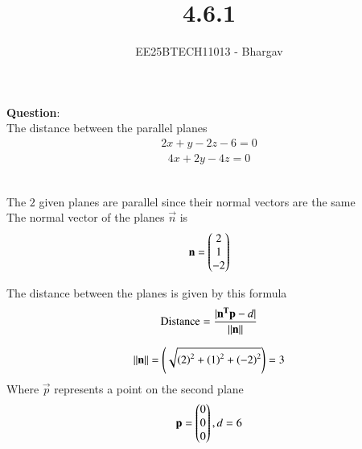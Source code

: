 \documentclass[journal]{IEEEtran}
\begin{document}

\vspace{3cm}

\title{4.6.1}
\author{EE25BTECH11013 - Bhargav}
\maketitle
{\let\newpage\relax\maketitle}

\renewcommand{\thefigure}{\theenumi}
\renewcommand{\thetable}{\theenumi}
\setlength{\intextsep}{10pt} %


\renewcommand{\thetable}{\theenumi}

\textbf{Question}:\\
The distance between the parallel planes 
\begin{align}
2x + y - 2z - 6 = 0
\end{align}
\begin{align}
4x + 2y - 4z = 0
\end{align}

\solution \\

The $2$ given planes are parallel since their normal vectors are the same\\

The normal vector of the planes $\vec{n}$ is
\begin{align}
\mathbf{n} = \begin{pmatrix}2 \\ 1 \\ -2\end{pmatrix}
\end{align}



The distance between the planes is given by this formula
\begin{align}
\text{Distance} = \frac{|\mathbf{n^T} \mathbf{p} - d|}{\left\lVert\mathbf{n}\right\rVert}
\end{align}

\begin{align}
{\left\lVert\mathbf{n}\right\rVert} = \left(\sqrt{\left(2\right)^2 + \left(1\right)^2 + \left(-2\right)^2}\right) = 3
\end{align}
Where $\vec{p}$ represents a point on the second plane\\
\begin{align}
\mathbf{p} = \begin{pmatrix}0 \\ 0 \\ 0\end{pmatrix}, d=6 
\end{align}
\end{document}
